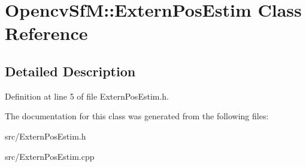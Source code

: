 \hypertarget{class_opencv_sf_m_1_1_extern_pos_estim}{
\section{OpencvSfM::ExternPosEstim Class Reference}
\label{class_opencv_sf_m_1_1_extern_pos_estim}
}


\subsection{Detailed Description}


Definition at line 5 of file ExternPosEstim.h.



The documentation for this class was generated from the following files:\begin{DoxyCompactItemize}
\item 
src/ExternPosEstim.h\item 
src/ExternPosEstim.cpp\end{DoxyCompactItemize}
